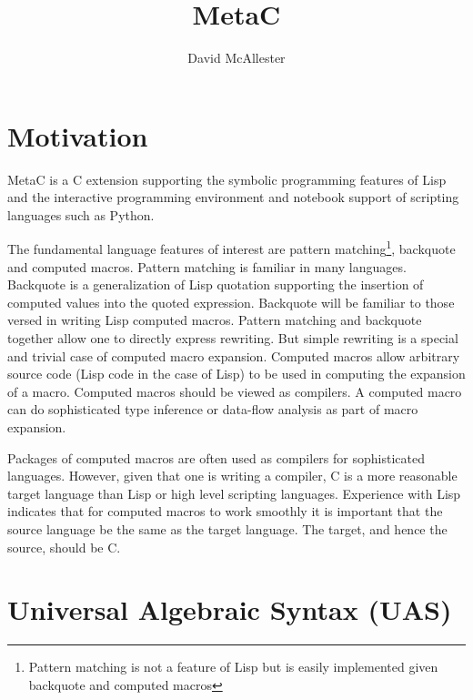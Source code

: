 \documentclass{article}
\title{MetaC}
\author{David McAllester}
\begin{document}
\maketitle

\section{Motivation}

\bigskip
\bigskip
MetaC is a C extension supporting the symbolic programming features of Lisp and the interactive programming environment and notebook support of scripting languages such as Python.

The fundamental language features of interest are pattern matching\footnote{Pattern matching is not a feature of Lisp but is easily implemented given backquote and computed macros},
backquote and computed macros. Pattern matching is familiar in many languages.  Backquote is a generalization of Lisp quotation supporting
the insertion of computed values into the quoted expression. Backquote will be familiar to
those versed in writing Lisp computed macros. Pattern matching and backquote together allow one to directly express rewriting. But simple rewriting is a special and trivial case of computed macro expansion.
Computed macros allow arbitrary source code (Lisp code in the case of Lisp) to be
used in computing the expansion of a macro.  Computed macros should be viewed as compilers.  A computed macro can do
sophisticated type inference or data-flow analysis as part of macro expansion.

Packages of computed macros are often used as compilers for sophisticated languages.  However, given that one is writing a compiler, C is a more reasonable target language than Lisp or high level scripting languages.
Experience with Lisp indicates that for computed macros to work smoothly it is important that the source language be the same as the target language.  The target, and hence the source, should be C.

\section{Universal Algebraic Syntax (UAS)}
\end{document}
